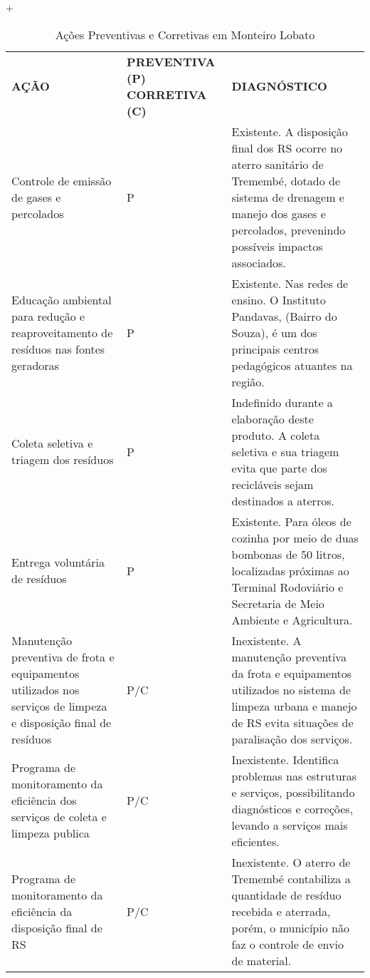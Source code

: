 +%
\begin{table}[htbp]
	\centering
	\caption{Ações Preventivas e Corretivas em Monteiro Lobato}
	\begin{tabular}{|P{15em}|P{7em}|P{22em}|}
		 \textcolor[rgb]{ 1,  1,  1}{\textbf{AÇÃO}} & \textcolor[rgb]{ 1,  1,  1}{\textbf{PREVENTIVA (P) CORRETIVA (C)}} & \textcolor[rgb]{ 1,  1,  1}{\textbf{DIAGNÓSTICO}} \\
		 Controle de emissão de gases e percolados & P     & Existente. A disposição final dos RS ocorre no aterro sanitário de Tremembé, dotado de sistema de drenagem e manejo dos gases e percolados, prevenindo possíveis impactos associados. \\
		 Educação ambiental para redução e reaproveitamento de resíduos nas fontes geradoras & P     & Existente. Nas redes de ensino. O Instituto Pandavas, (Bairro do Souza), é um dos principais centros pedagógicos atuantes na região. \\
		 Coleta seletiva e triagem dos resíduos & P     & Indefinido durante a elaboração deste produto. A coleta seletiva e sua triagem evita que parte dos recicláveis sejam destinados a aterros. \\
		 Entrega voluntária de resíduos & P     & Existente. Para óleos de cozinha por meio de duas bombonas de 50 litros, localizadas próximas ao Terminal Rodoviário e Secretaria de Meio Ambiente e Agricultura. \\
		 Manutenção preventiva de frota e equipamentos utilizados nos serviços de limpeza e disposição final de resíduos & P/C & Inexistente. A manutenção preventiva da frota e equipamentos utilizados no sistema de limpeza urbana e manejo de RS evita situações de paralisação dos serviços. \\
		 Programa de monitoramento da eficiência dos serviços de coleta e limpeza publica & P/C   & Inexistente. Identifica problemas nas estruturas e serviços, possibilitando diagnósticos e correções, levando a serviços mais eficientes. \\
		 Programa de monitoramento da eficiência da disposição final de RS & P/C   & Inexistente. O aterro de Tremembé contabiliza a quantidade de resíduo recebida e aterrada, porém, o município não faz o controle de envio de material. \\

\end{tabular}
\end{table}
